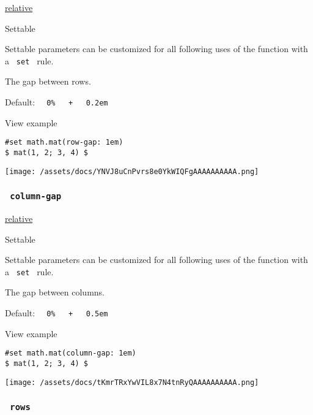 \href{/docs/reference/layout/relative/}{relative}

{{ Settable }}

\label{parameters-row-gap-settable-tooltip}
Settable parameters can be customized for all following uses of the
function with a \texttt{\ set\ } rule.

The gap between rows.

Default:
\texttt{\ }{\texttt{\ 0\%\ }}\texttt{\ }{\texttt{\ +\ }}\texttt{\ }{\texttt{\ 0.2em\ }}\texttt{\ }


View example

\begin{verbatim}
#set math.mat(row-gap: 1em)
$ mat(1, 2; 3, 4) $
\end{verbatim}

\texttt{[image: /assets/docs/YNVJ8uCnPvrs8e0YkWIQFgAAAAAAAAAA.png]}

\subsubsection{\texorpdfstring{\texttt{\ column-gap\ }}{ column-gap }}\label{parameters-column-gap}

\href{/docs/reference/layout/relative/}{relative}

{{ Settable }}

\label{parameters-column-gap-settable-tooltip}
Settable parameters can be customized for all following uses of the
function with a \texttt{\ set\ } rule.

The gap between columns.

Default:
\texttt{\ }{\texttt{\ 0\%\ }}\texttt{\ }{\texttt{\ +\ }}\texttt{\ }{\texttt{\ 0.5em\ }}\texttt{\ }


View example

\begin{verbatim}
#set math.mat(column-gap: 1em)
$ mat(1, 2; 3, 4) $
\end{verbatim}

\texttt{[image: /assets/docs/tKmrTRxYwVIL8x7N4tnRyQAAAAAAAAAA.png]}

\subsubsection{\texorpdfstring{\texttt{\ rows\ }}{ rows }}\label{parameters-rows}

